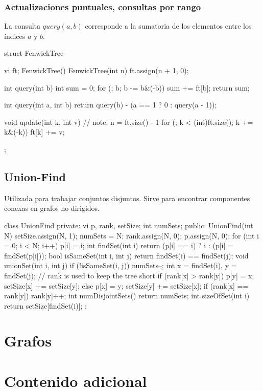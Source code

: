 \documentclass[oneside]{book}
\begin{document}
	\subsection{Actualizaciones puntuales, consultas por rango}
	La consulta $query(a,b)$ corresponde a la sumatoria de los elementos entre los \'indices $a$ y $b$.
	\begin{codigo}
struct FenwickTree {
  vi ft;
  FenwickTree(){}  
  FenwickTree(int n){
    ft.assign(n + 1, 0);
  }

  int query(int b) {
    int sum = 0;
    for (; b; b -= b&(-b)) sum += ft[b];
    return sum;
  }

  int query(int a, int b) {
    return query(b) - (a == 1 ? 0 : query(a - 1));
  }

  void update(int k, int v) {                    // note: n = ft.size() - 1
    for (; k < (int)ft.size(); k += k&(-k)) ft[k] += v;
  }
};
	\end{codigo}
	\section{Union-Find}
	Utilizada para trabajar conjuntos disjuntos. Sirve para encontrar componentes conexas en grafos no dirigidos.
	\begin{codigo}
class UnionFind {
private:
  vi p, rank, setSize;
  int numSets;
public:
  UnionFind(int N) {
	setSize.assign(N, 1); numSets = N; rank.assign(N, 0);
	p.assign(N, 0); for (int i = 0; i < N; i++) p[i] = i; }
  int findSet(int i) { return (p[i] == i) ? i : (p[i] = findSet(p[i])); }
  bool isSameSet(int i, int j) { return findSet(i) == findSet(j); }
  void unionSet(int i, int j) {  
	if (!isSameSet(i, j)) { numSets--;  
	int x = findSet(i), y = findSet(j);
	// rank is used to keep the tree short
	if (rank[x] > rank[y]) { p[y] = x; setSize[x] += setSize[y]; }
	else               	   { p[x] = y; setSize[y] += setSize[x];
                             if (rank[x] == rank[y]) rank[y]++; } } }
  int numDisjointSets() { return numSets; }
  int sizeOfSet(int i) { return setSize[findSet(i)]; }
};

	\end{codigo}
	
	

	
	\chapter{Grafos}
	
	\backmatter
	\chapter{Contenido adicional}
\end{document}
